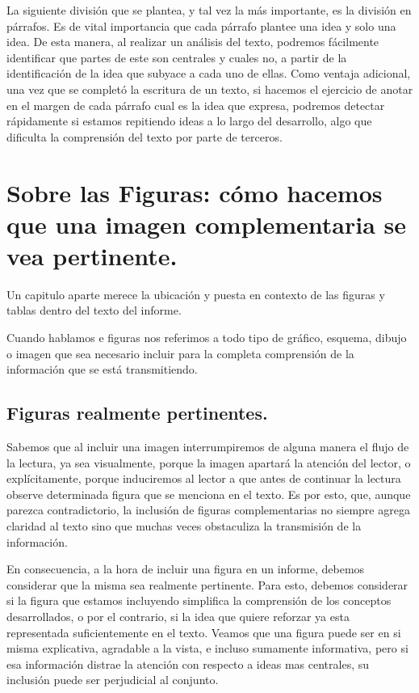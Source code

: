 \documentclass[11pt]{article}
\begin{document}
La siguiente división que se plantea, y tal vez la más importante, es la división en párrafos. Es de
vital importancia que cada párrafo plantee una idea y solo una idea. De esta manera, al realizar un
análisis del texto, podremos fácilmente identificar que partes de este son centrales y cuales no, a 
partir de la identificación de la idea que subyace a cada uno de ellas. Como ventaja adicional, una vez
que se completó la escritura de un texto, si hacemos el ejercicio de anotar en el margen de cada párrafo
cual es la idea que expresa, podremos detectar rápidamente si estamos repitiendo ideas a lo largo del
desarrollo, algo que dificulta la comprensión del texto por parte de terceros.

\section{Sobre las Figuras: cómo hacemos que una imagen complementaria se vea pertinente.}
\label{sec-3}

Un capitulo aparte merece la ubicación y puesta en contexto de las figuras y tablas dentro del texto 
del informe.

Cuando hablamos e figuras nos referimos a todo tipo de gráfico, esquema, dibujo o imagen que sea necesario
incluir para la completa comprensión de la información que se está transmitiendo.

\subsection{Figuras realmente pertinentes.}
\label{sec-3-1}

Sabemos que al incluir una imagen interrumpiremos de alguna manera el flujo de la lectura, ya sea visualmente,
porque la imagen apartará la atención del lector, o explícitamente, porque induciremos al lector a que 
antes de continuar la lectura observe determinada figura que se menciona en el texto.
Es por esto, que, aunque parezca contradictorio, la inclusión de figuras complementarias no siempre agrega
claridad al texto sino que muchas veces obstaculiza la transmisión de la información.

En consecuencia, a la hora de incluir una figura en un informe, debemos considerar que la misma sea 
realmente pertinente. Para esto, debemos considerar si la figura que estamos incluyendo simplifica 
la comprensión de los conceptos desarrollados, o por el contrario, si la idea que quiere reforzar
ya esta representada suficientemente en el texto. Veamos que una figura puede ser en si misma 
explicativa, agradable a la vista, e incluso sumamente informativa, pero si esa información distrae
la atención con respecto a ideas mas centrales, su inclusión puede ser perjudicial al conjunto.
\end{document}
